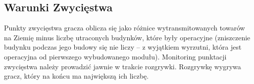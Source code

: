 \documentclass[11pt,a4paper]{article}
\begin{document}
\subsection{Warunki Zwycięstwa}

Punkty zwycięstwa gracza oblicza się jako różnice wytransmitowanych towarów na Ziemię minus liczbę utraconych budynków, które były operacyjne (zniszczenie budynku podczas jego budowy się nie liczy -- z wyjątkiem wyrzutni, która jest operacyjna od pierwszego wybudowanego modułu). Monitoring punktacji zwycięstwa należy prowadzić jawnie w trakcie rozgrywki. Rozgrywkę wygrywa gracz, który na końcu ma największą ich liczbę.
\end{document}
